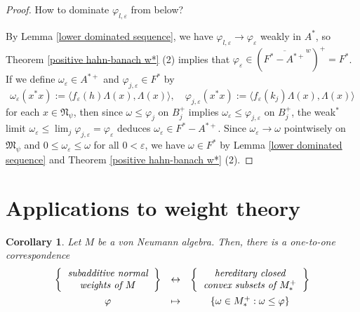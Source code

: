 \documentclass[a4paper]{amsart}
\newcommand{\e}{\varepsilon}
\theoremstyle{plain}
\newtheorem{cor}[thm]{Corollary}
\theoremstyle{definition}
\begin{document}
\begin{proof}
How to dominate $\varphi_{l,\e}$ from below?


By Lemma \ref{lower dominated sequence}, we have $\varphi_{l,\e}\to\varphi_\e$ weakly in $A^*$, so Theorem \ref{positive hahn-banach w*} (2) implies that $\varphi_\e\in(\overline{F^*-A^{*+}}^w)^+=F^*$.
If we define $\omega_\e\in A^{*+}$ and $\varphi_{j,\e}\in F^*$ by
\[\omega_\e(x^*x):=\langle f_\e(h)\Lambda(x),\Lambda(x)\rangle,\quad\varphi_{j,\e}(x^*x):=\langle f_\e(k_j)\Lambda(x),\Lambda(x)\rangle\]
for each $x\in\mathfrak{N}_\psi$, then since $\omega\le\varphi_j$ on $B_j^+$ implies $\omega_\e\le\varphi_{j,\e}$ on $B_j^+$, the weak$^*$ limit $\omega_\e\le\lim_j\varphi_{j,\e}=\varphi_\e$ deduces $\omega_\e\in F^*-A^{*+}$.
Since $\omega_\e\to\omega$ pointwisely on $\mathfrak{M}_\psi$ and $0\le\omega_\e\le\omega$ for all $0<\e$, we have $\omega\in F^*$ by Lemma \ref{lower dominated sequence} and Theorem \ref{positive hahn-banach w*} (2).

\end{proof}




\section{Applications to weight theory}

\begin{cor}
Let $M$ be a von Neumann algebra.
Then, there is a one-to-one correspondence
\[\begin{array}{ccc}
\left\{\emph{\begin{tabular}{c}subadditive normal\\weights of $M$\end{tabular}}\right\}&\leftrightarrow&\left\{\emph{\begin{tabular}{c}hereditary closed\\convex subsets of $M_*^+$\end{tabular}}\right\}\\[10pt]
\varphi&\mapsto&\{\omega\in M_*^+:\omega\le\varphi\}
\end{array}\]
\end{cor}
\end{document}
